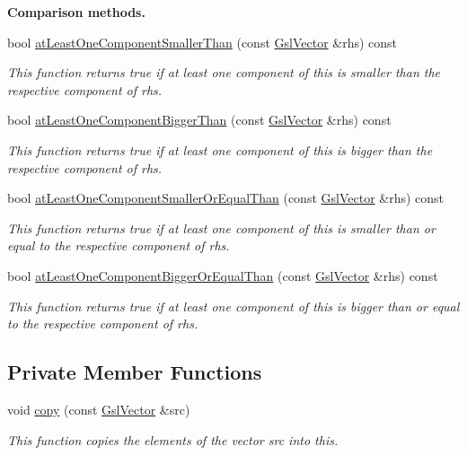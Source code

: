 \begin{Indent}{\bf Comparison methods.}\par
\begin{DoxyCompactItemize}
\item 
bool \hyperlink{class_q_u_e_s_o_1_1_gsl_vector_a5b08e4ba8665bb5849da74ac42928741}{at\-Least\-One\-Component\-Smaller\-Than} (const \hyperlink{class_q_u_e_s_o_1_1_gsl_vector}{Gsl\-Vector} \&rhs) const 
\begin{DoxyCompactList}\small\item\em This function returns true if at least one component of {\ttfamily this} is smaller than the respective component of rhs. \end{DoxyCompactList}\item 
bool \hyperlink{class_q_u_e_s_o_1_1_gsl_vector_ad98d06b7c03175741c8208cfe62d8224}{at\-Least\-One\-Component\-Bigger\-Than} (const \hyperlink{class_q_u_e_s_o_1_1_gsl_vector}{Gsl\-Vector} \&rhs) const 
\begin{DoxyCompactList}\small\item\em This function returns true if at least one component of {\ttfamily this} is bigger than the respective component of rhs. \end{DoxyCompactList}\item 
bool \hyperlink{class_q_u_e_s_o_1_1_gsl_vector_a944fb91bd7f91f3987d9cfbfa3f58cfb}{at\-Least\-One\-Component\-Smaller\-Or\-Equal\-Than} (const \hyperlink{class_q_u_e_s_o_1_1_gsl_vector}{Gsl\-Vector} \&rhs) const 
\begin{DoxyCompactList}\small\item\em This function returns true if at least one component of {\ttfamily this} is smaller than or equal to the respective component of rhs. \end{DoxyCompactList}\item 
bool \hyperlink{class_q_u_e_s_o_1_1_gsl_vector_ac8e9dacbea49e0ee56462af34aaeeed8}{at\-Least\-One\-Component\-Bigger\-Or\-Equal\-Than} (const \hyperlink{class_q_u_e_s_o_1_1_gsl_vector}{Gsl\-Vector} \&rhs) const 
\begin{DoxyCompactList}\small\item\em This function returns true if at least one component of {\ttfamily this} is bigger than or equal to the respective component of rhs. \end{DoxyCompactList}\end{DoxyCompactItemize}
\end{Indent}
\subsection*{Private Member Functions}
\begin{DoxyCompactItemize}
\item 
void \hyperlink{class_q_u_e_s_o_1_1_gsl_vector_a95d78ab4f5b1c7f16ff453d770a955fb}{copy} (const \hyperlink{class_q_u_e_s_o_1_1_gsl_vector}{Gsl\-Vector} \&src)
\begin{DoxyCompactList}\small\item\em This function copies the elements of the vector src into {\ttfamily this}. \end{DoxyCompactList}\end{DoxyCompactItemize}
